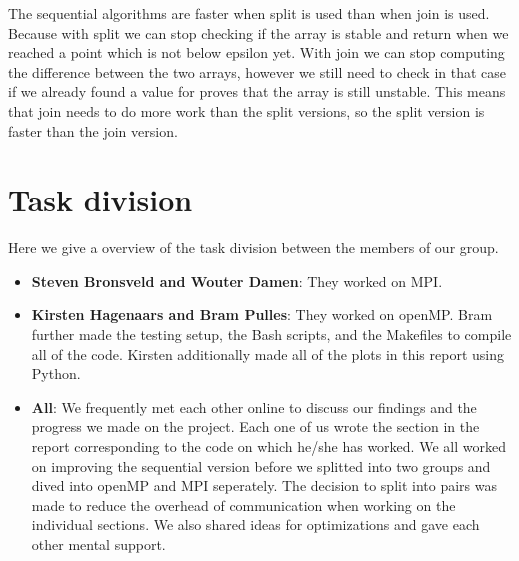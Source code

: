 \documentclass[a4paper]{article}
\begin{document}
The sequential algorithms are faster when split is used than when join is used. Because with split we can stop checking if the array is stable and return when we reached a point which is not below epsilon yet. With join we can stop computing the difference between the two arrays, however we still need to check in that case if we already found a value for proves that the array is still unstable. This means that join needs to do more work than the split versions, so the split version is faster than the join version.


\section{Task division}
Here we give a overview of the task division between the members of our group.
\begin{itemize}
    \item \textbf{Steven Bronsveld and Wouter Damen}: They worked on MPI.
    \item \textbf{Kirsten Hagenaars and Bram Pulles}: They worked on openMP. Bram further made the testing setup, the Bash scripts, and the Makefiles to compile all of the code. Kirsten additionally made all of the plots in this report using Python.
    \item \textbf{All}: We frequently met each other online to discuss our findings and the progress we made on the project. Each one of us wrote the section in the report corresponding to the code on which he/she has worked. We all worked on improving the sequential version before we splitted into two groups and dived into openMP and MPI seperately. The decision to split into pairs was made to reduce the overhead of communication when working on the individual sections. We also shared ideas for optimizations and gave each other mental support.
\end{itemize}
\end{document}
